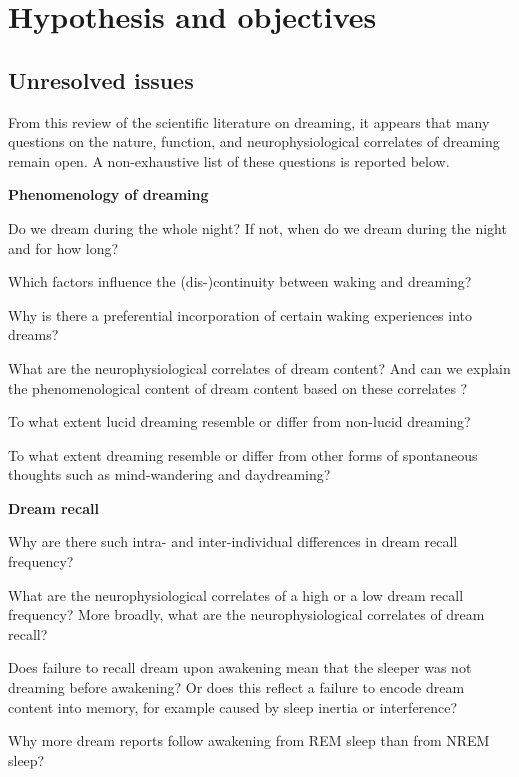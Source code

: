 \cleardoublepage

\chapter{Hypothesis and objectives}
\label{sec:problematic}


\section{Unresolved issues}
\label{sec:problematic:unresolved}

From this review of the scientific literature on dreaming, it appears that many questions on the nature, function, and neurophysiological correlates of dreaming remain open. A non-exhaustive list of these questions is reported below.

\textbf{Phenomenology of dreaming}
\begin{my_list_item}
    \item Do we dream during the whole night? If not, when do we dream during the night and for how long?
	\item Which factors influence the (dis-)continuity between waking and dreaming?
	\item Why is there a preferential incorporation of certain waking experiences into dreams?
	\item What are the neurophysiological correlates of dream content? And can we explain the phenomenological content of dream content based on these correlates ?
	\item To what extent lucid dreaming resemble or differ from non-lucid dreaming?
	\item To what extent dreaming resemble or differ from other forms of spontaneous thoughts such as mind-wandering and daydreaming?
\end{my_list_item}

\textbf{Dream recall}
\begin{my_list_item}
	\item Why are there such intra- and inter-individual differences in dream recall frequency?
	\item What are the neurophysiological correlates of a high or a low dream recall frequency? More broadly, what are the neurophysiological correlates of dream recall?
	\item Does failure to recall dream upon awakening mean that the sleeper was not dreaming before awakening? Or does this reflect a failure to encode dream content into memory, for example caused by sleep inertia or interference?
	\item Why more dream reports follow awakening from REM sleep than from NREM sleep?
\end{my_list_item}

